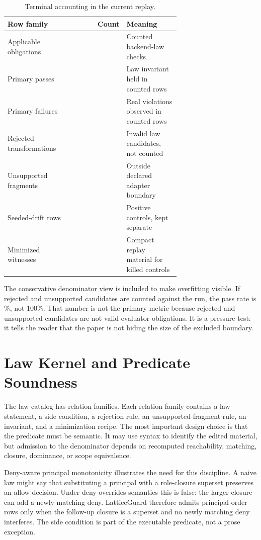 \documentclass[10pt,conference]{IEEEtran}
\begin{document}
\begin{table}[t]
\centering
\caption{Terminal accounting in the current replay.}
\label{tab:accounting}
\begin{tabular}{p{0.37\linewidth}r p{0.31\linewidth}}
\toprule
Row family & Count & Meaning \\
\midrule
Applicable obligations & \LGPrimaryObligations{} & Counted backend-law checks \\
Primary passes & \LGPrimaryPasses{} & Law invariant held in counted rows \\
Primary failures & \LGPrimaryFailures{} & Real violations observed in counted rows \\
Rejected transformations & \LGRejected{} & Invalid law candidates, not counted \\
Unsupported fragments & \LGUnsupported{} & Outside declared adapter boundary \\
Seeded-drift rows & \LGSeededRows{} & Positive controls, kept separate \\
Minimized witnesses & \LGCounterexamples{} & Compact replay material for killed controls \\
\bottomrule
\end{tabular}
\end{table}

The conservative denominator view is included to make overfitting visible.  If rejected and unsupported candidates are counted against the run, the pass rate is \LGAllCandidatePassRate{}\%, not 100\%.  That number is not the primary metric because rejected and unsupported candidates are not valid evaluator obligations.  It is a pressure test: it tells the reader that the paper is not hiding the size of the excluded boundary.

\section{Law Kernel and Predicate Soundness}
The law catalog has \LGRelations{} relation families.  Each relation family contains a law statement, a side condition, a rejection rule, an unsupported-fragment rule, an invariant, and a minimization recipe.  The most important design choice is that the predicate must be semantic.  It may use syntax to identify the edited material, but admission to the denominator depends on recomputed reachability, matching, closure, dominance, or scope equivalence.

Deny-aware principal monotonicity illustrates the need for this discipline.  A naive law might say that substituting a principal with a role-closure superset preserves an allow decision.  Under deny-overrides semantics this is false: the larger closure can add a newly matching deny.  LatticeGuard therefore admits principal-order rows only when the follow-up closure is a superset and no newly matching deny interferes.  The side condition is part of the executable predicate, not a prose exception.
\end{document}
